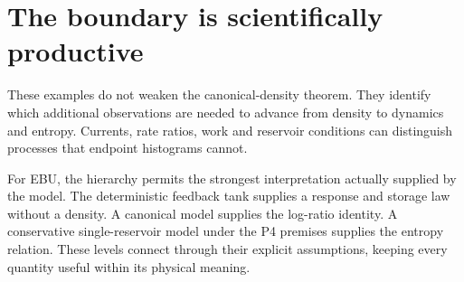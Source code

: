 \section{The boundary is scientifically productive}
These examples do not weaken the canonical-density theorem. They identify which additional observations are needed to advance from density to dynamics and entropy. Currents, rate ratios, work and reservoir conditions can distinguish processes that endpoint histograms cannot.

For EBU, the hierarchy permits the strongest interpretation actually supplied by the model. The deterministic feedback tank supplies a response and storage law without a density. A canonical model supplies the log-ratio identity. A conservative single-reservoir model under the P4 premises supplies the entropy relation. These levels connect through their explicit assumptions, keeping every quantity useful within its physical meaning.
